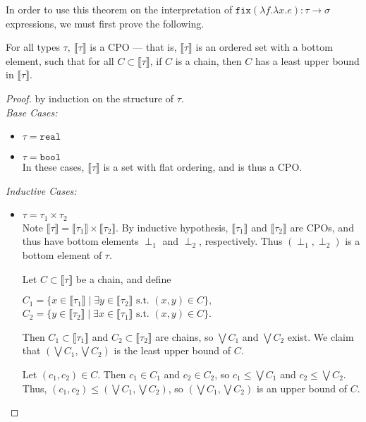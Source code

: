 In order to use this theorem on the interpretation of $\texttt{fix}(\lambda f. \lambda x.e): \tau \rightarrow \sigma$ expressions, 
we must first prove the following.
\begin{thm}
For all types $\tau, \ \llbracket \tau \rrbracket$ is a CPO --- that is, $\llbracket \tau \rrbracket$ is an ordered 
set with a bottom element, such that for all $ C \subset \llbracket \tau \rrbracket$, if  $C$ is a chain, then $C$ has a least 
upper bound in $\llbracket \tau \rrbracket$. 
\end{thm}
\begin{proof}
by induction on the structure of $\tau$. \\
\emph{Base Cases: }
\begin{itemize}
\item $\tau = \texttt{real}$
\item $\tau = \texttt{bool}$ \\
In these cases, $\llbracket \tau \rrbracket$ is a set with flat ordering, and is thus a CPO. 
\end{itemize}
\emph{Inductive Cases: }
\begin{itemize}
\item $\tau = \tau_1 \times \tau_2$  \\
Note $\llbracket \tau \rrbracket = \llbracket \tau_1 \rrbracket \times \llbracket \tau_2 \rrbracket$. By inductive hypothesis,
$\llbracket \tau_1 \rrbracket$ and $\llbracket \tau_2 \rrbracket$ are CPOs, and thus have bottom elements $\perp_1$ and $
\perp_2$, respectively. Thus $(\perp_1, \perp_2)$ is a bottom element of $\tau$. 

Let $C \subset \llbracket \tau \rrbracket$ be a
chain, and define
\begin{center}
$C_1 = \{x \in \llbracket \tau_1 \rrbracket \mid \exists y \in \llbracket \tau_2 \rrbracket \text{ s.t. } (x,y) \in C\},$ \\
$C_2 = \{ y \in \llbracket \tau_2 \rrbracket\mid \exists x \in \llbracket \tau_1 \rrbracket \text{ s.t. } (x,y) \in C\}$. \\ 
\end{center}
Then $C_1 \subset \llbracket \tau_1 \rrbracket$ and $C_2 \subset \llbracket \tau_2 \rrbracket$ are chains, so $\bigvee C_1$
and $\bigvee C_2$ exist. We claim that $(\bigvee C_1, \bigvee C_2)$ is the least upper bound of $C$. 

Let $(c_1, c_2) \in C$. Then $c_1 \in C_1$ and $c_2 \in C_2$, so $c_1 \leq \bigvee C_1$ and $c_2 \leq \bigvee C_2$. Thus, 
$(c_1, c_2) \leq (\bigvee C_1, \bigvee C_2)$, so $(\bigvee C_1, \bigvee C_2)$ is an upper bound of $C$.


\end{itemize}
\end{proof}
